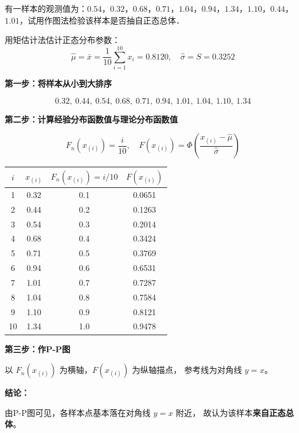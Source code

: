 \begin{homework}[2]
有一样本的观测值为：$0.54$，$0.32$，$0.68$，$0.71$，$1.04$，$0.94$，$1.34$，$1.10$，$0.44$，$1.01$，试用作图法检验该样本是否抽自正态总体．
\end{homework}
\begin{solution}
用矩估计法估计正态分布参数：
$$\hat{\mu} = \bar{x} = \frac{1}{10}\sum_{i=1}^{10}x_i = 0.8120, \quad
\hat{\sigma} = S = 0.3252$$

\textbf{第一步：将样本从小到大排序}

$$0.32,\ 0.44,\ 0.54,\ 0.68,\ 0.71,\ 0.94,\ 1.01,\ 1.04,\ 1.10,\ 1.34$$

\textbf{第二步：计算经验分布函数值与理论分布函数值}

$$F_n(x_{(i)}) = \frac{i}{10}, \quad
F(x_{(i)}) = \Phi\!\left(\frac{x_{(i)} - \hat{\mu}}{\hat{\sigma}}\right)$$

\begin{table}[h]
\centering
\begin{tabular}{cccc}
\hline
$i$ & $x_{(i)}$ & $F_n(x_{(i)}) = i/10$ & $F(x_{(i)})$ \\
\hline
1  & 0.32 & 0.1 & 0.0651 \\
2  & 0.44 & 0.2 & 0.1263 \\
3  & 0.54 & 0.3 & 0.2014 \\
4  & 0.68 & 0.4 & 0.3424 \\
5  & 0.71 & 0.5 & 0.3769 \\
6  & 0.94 & 0.6 & 0.6531 \\
7  & 1.01 & 0.7 & 0.7287 \\
8  & 1.04 & 0.8 & 0.7584 \\
9  & 1.10 & 0.9 & 0.8121 \\
10 & 1.34 & 1.0 & 0.9478 \\
\hline
\end{tabular}
\end{table}

\textbf{第三步：作P-P图}

以 $F_n(x_{(i)})$ 为横轴，$F(x_{(i)})$ 为纵轴描点，
参考线为对角线 $y = x$。

\textbf{结论：}

由P-P图可见，各样本点基本落在对角线 $y = x$ 附近，
故认为该样本\textbf{来自正态总体}。

\end{solution}

